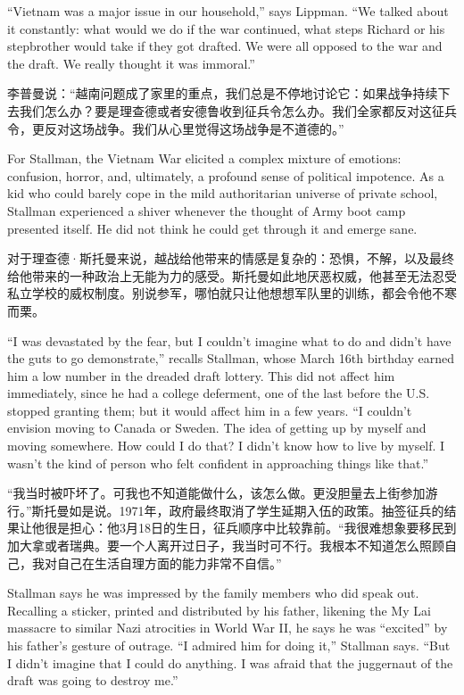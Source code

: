 \ifdefined\eng
``Vietnam was a major issue in our household,'' says Lippman. ``We talked about it constantly: what would we do if the war continued, what steps Richard or his stepbrother would take if they got drafted. We were all opposed to the war and the draft. We really thought it was immoral.''
\fi

\ifdefined\chs
李普曼说：``越南问题成了家里的重点，我们总是不停地讨论它：如果战争持续下去我们怎么办？要是理查德或者安德鲁收到征兵令怎么办。我们全家都反对这征兵令，更反对这场战争。我们从心里觉得这场战争是不道德的。''
\fi

\ifdefined\eng
For Stallman, the Vietnam War elicited a complex mixture of emotions: confusion, horror, and, ultimately, a profound sense of political impotence. As a kid who could barely cope in the mild authoritarian universe of private school, Stallman experienced a shiver whenever the thought of Army boot camp presented itself. He did not think he could get through it and emerge sane.
\fi

\ifdefined\chs
对于理查德·斯托曼来说，越战给他带来的情感是复杂的：恐惧，不解，以及最终给他带来的一种政治上无能为力的感受。斯托曼如此地厌恶权威，他甚至无法忍受私立学校的威权制度。别说参军，哪怕就只让他想想军队里的训练，都会令他不寒而栗。
\fi

\ifdefined\eng
``I was devastated by the fear, but I couldn't imagine what to do and didn't have the guts to go demonstrate,'' recalls Stallman, whose March 16th birthday earned him a low number in the dreaded draft lottery.  This did not affect him immediately, since he had a college deferment, one of the last before the U.S. stopped granting them; but it would affect him in a few years. ``I couldn't envision moving to Canada or Sweden. The idea of getting up by myself and moving somewhere. How could I do that? I didn't know how to live by myself. I wasn't the kind of person who felt confident in approaching things like that.''
\fi

\ifdefined\chs
``我当时被吓坏了。可我也不知道能做什么，该怎么做。更没胆量去上街参加游行。''斯托曼如是说。1971年，政府最终取消了学生延期入伍的政策。抽签征兵的结果让他很是担心：他3月18日的生日，征兵顺序中比较靠前。``我很难想象要移民到加大拿或者瑞典。要一个人离开过日子，我当时可不行。我根本不知道怎么照顾自己，我对自己在生活自理方面的能力非常不自信。''
\fi

\ifdefined\eng
Stallman says he was impressed by the family members who did speak out. Recalling a sticker, printed and distributed by his father, likening the My Lai massacre to similar Nazi atrocities in World War II, he says he was ``excited'' by his father's gesture of outrage. ``I admired him for doing it,'' Stallman says. ``But I didn't imagine that I could do anything. I was afraid that the juggernaut of the draft was going to destroy me.''
\fi

